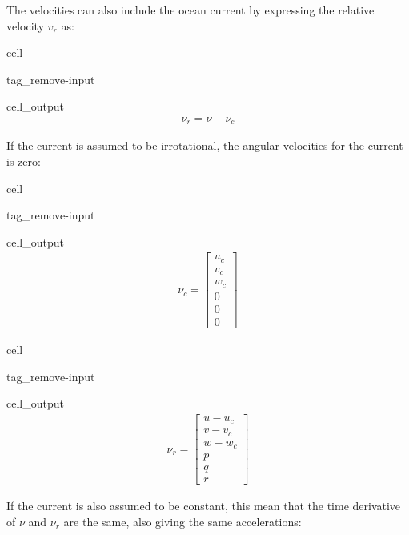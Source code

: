 \documentclass[review]{elsarticle}
\begin{document}
\sphinxAtStartPar
The velocities can also include the ocean current by expressing the relative velocity \(v_r\) as:

\begin{sphinxuseclass}{cell}
\begin{sphinxuseclass}{tag_remove-input}
\begin{sphinxuseclass}{cell_output}\begin{equation*}
\begin{split}\displaystyle \nu_{r} = \nu - \nu_{c}\end{split}
\end{equation*}
\end{sphinxuseclass}
\end{sphinxuseclass}
\end{sphinxuseclass}
\sphinxAtStartPar
If the current is assumed to be irrotational, the angular velocities for the current is zero:

\begin{sphinxuseclass}{cell}
\begin{sphinxuseclass}{tag_remove-input}
\begin{sphinxuseclass}{cell_output}\begin{equation*}
\begin{split}\displaystyle \nu_{c} = \left[\begin{matrix}u_{c}\\v_{c}\\w_{c}\\0\\0\\0\end{matrix}\right]\end{split}
\end{equation*}
\end{sphinxuseclass}
\end{sphinxuseclass}
\end{sphinxuseclass}
\begin{sphinxuseclass}{cell}
\begin{sphinxuseclass}{tag_remove-input}
\begin{sphinxuseclass}{cell_output}\begin{equation*}
\begin{split}\displaystyle \nu_{r} = \left[\begin{matrix}u - u_{c}\\v - v_{c}\\w - w_{c}\\p\\q\\r\end{matrix}\right]\end{split}
\end{equation*}
\end{sphinxuseclass}
\end{sphinxuseclass}
\end{sphinxuseclass}
\sphinxAtStartPar
If the current is also assumed to be constant, this mean that the time derivative of \(\nu\) and \(\nu_r\) are the same, also giving the same accelerations:
\end{document}
